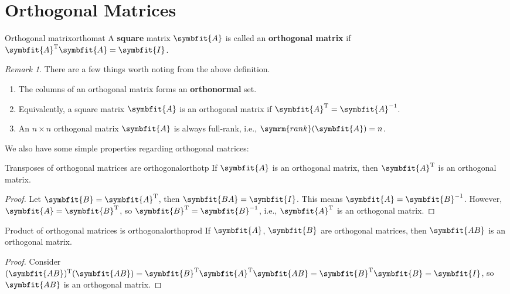 \documentclass[math]{amznotes}
\theoremstyle{remark}
\newtheorem*{remark}{Remark}
\begin{document}
\section{Orthogonal Matrices}
\begin{dfnbox}{Orthogonal matrix}{orthomat}
    A {\color{red} \textbf{square}} matrix $\symbfit{A}$ is called an {\color{red} \textbf{orthogonal matrix}} if $\symbfit{A}^{\mathrm{T}}\symbfit{A} = \symbfit{I}$.
\end{dfnbox}
\begin{notebox}
    \begin{remark}
        There are a few things worth noting from the above definition.
        \begin{enumerate}
            \item The columns of an orthogonal matrix forms an {\color{red} \textbf{orthonormal}} set.
            \item Equivalently, a square matrix $\symbfit{A}$ is an orthogonal matrix if $\symbfit{A}^{\mathrm{T}} = \symbfit{A}^{-1}$.
            \item An $n \times n$ orthogonal matrix $\symbfit{A}$ is always full-rank, i.e., $\symrm{rank}(\symbfit{A}) = n$.
        \end{enumerate}
    \end{remark}
\end{notebox}
We also have some simple properties regarding orthogonal matrices:
\begin{thmbox}{Transposes of orthogonal matrices are orthogonal}{orthotp}
    If $\symbfit{A}$ is an orthogonal matrix, then $\symbfit{A}^{\mathrm{T}}$ is an orthogonal matrix.
    \tcblower
    \begin{proof}
        Let $\symbfit{B} = \symbfit{A}^{\mathrm{T}}$, then $\symbfit{BA} = \symbfit{I}$. This means $\symbfit{A} = \symbfit{B}^{-1}$. However, $\symbfit{A} = \symbfit{B}^{\mathrm{T}}$, so $\symbfit{B}^{\mathrm{T}} = \symbfit{B}^{-1}$, i.e., $\symbfit{A}^{\mathrm{T}}$ is an orthogonal matrix.
    \end{proof}
\end{thmbox}
\begin{thmbox}{Product of orthogonal matrices is orthogonal}{orthoprod}
    If $\symbfit{A}$, $\symbfit{B}$ are orthogonal matrices, then $\symbfit{AB}$ is an orthogonal matrix.
    \tcblower
    \begin{proof}
        Consider $(\symbfit{AB})^{\mathrm{T}}(\symbfit{AB}) = \symbfit{B}^{\mathrm{T}}\symbfit{A}^{\mathrm{T}}\symbfit{AB} = \symbfit{B}^{\mathrm{T}}\symbfit{B} = \symbfit{I}$, so $\symbfit{AB}$ is an orthogonal matrix.
    \end{proof}
\end{thmbox}
\end{document}
